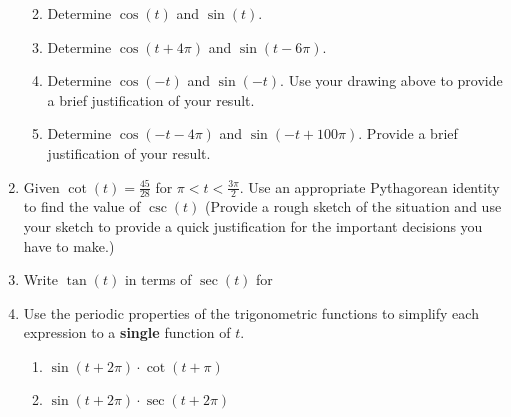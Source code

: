 \begin{enumerate}
\begin{enumerate}
  \vfill

\item Determine $\cos(t)$ and $\sin(t)$.

  \vfill

\item Determine $\cos(t+4\pi)$ and $\sin(t-6\pi)$.

  \vfill

\item Determine $\cos(-t)$ and $\sin(-t)$. Use your drawing above to
  provide a brief justification of your result.

  \vfill

\item Determine $\cos(-t-4\pi)$ and $\sin(-t+100\pi)$. Provide a brief
  justification of your result.

  \vfill
  
\end{enumerate}


\clearpage

\item Given $\cot(t)=\frac{45}{28}$ for $\pi<t<\frac{3\pi}{2}$.  Use
  an appropriate Pythagorean identity to find the value of $\csc(t)$
  (Provide a rough sketch of the situation and use your sketch to
  provide a quick justification for the important decisions you have
  to make.)

  \vfill
  
\item Write $\tan(t)$ in terms of $\sec(t)$ for
\begin{enumerate}
\end{enumerate}

\vfill

\clearpage

\item Use the periodic properties of the trigonometric functions to simplify each expression to a \textbf{single} function of $t$.

\begin{enumerate} 
\item $\sin(t+2\pi)\cdot \cot(t+\pi)$\vfill
\item  $\sin(t+2\pi)\cdot \sec(t+2\pi)$\vfill
\end{enumerate}




\end{enumerate}
